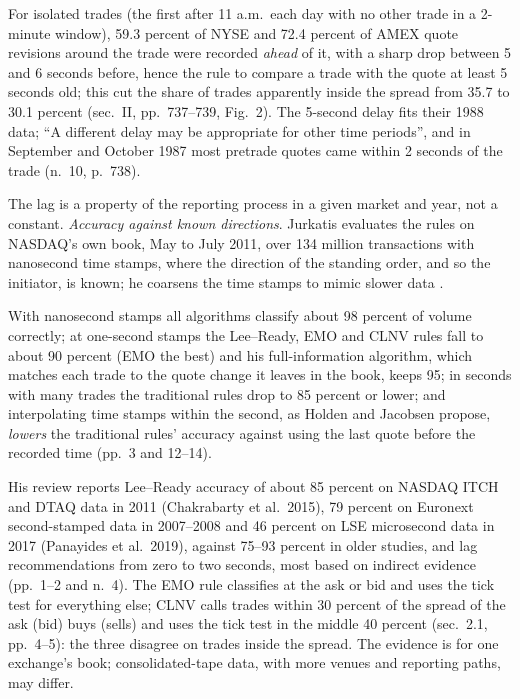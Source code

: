 \begin{qfmethod}
For isolated trades (the first after 11 a.m.\ each day with no other trade in a 2-minute window), 59.3 percent of NYSE and 72.4 percent of AMEX quote revisions around the trade were recorded \emph{ahead} of it, with a sharp drop between 5 and 6 seconds before, hence the rule to compare a trade with the quote at least 5 seconds old; this cut the share of trades apparently inside the spread from 35.7 to 30.1 percent (sec.~II, pp.~737--739, Fig.~2). The 5-second delay fits their 1988 data; ``A different delay may be appropriate for other time periods'', and in September and October 1987 most pretrade quotes came within 2 seconds of the trade (n.~10, p.~738).

The lag is a property of the reporting process in a given market and year, not a constant. \emph{Accuracy against known directions}. Jurkatis evaluates the rules on NASDAQ's own book, May to July 2011, over 134 million transactions with nanosecond time stamps, where the direction of the standing order, and so the initiator, is known; he coarsens the time stamps to mimic slower data \citep[secs.~1 and~4, pp.~3 and~12]{jurkatis-2020}.

With nanosecond stamps all algorithms classify about 98 percent of volume correctly; at one-second stamps the Lee--Ready, EMO and CLNV rules fall to about 90 percent (EMO the best) and his full-information algorithm, which matches each trade to the quote change it leaves in the book, keeps 95; in seconds with many trades the traditional rules drop to 85 percent or lower; and interpolating time stamps within the second, as Holden and Jacobsen propose, \emph{lowers} the traditional rules' accuracy against using the last quote before the recorded time (pp.~3 and 12--14).

His review reports Lee--Ready accuracy of about 85 percent on NASDAQ ITCH and DTAQ data in 2011 (Chakrabarty et al.\ 2015), 79 percent on Euronext second-stamped data in 2007--2008 and 46 percent on LSE microsecond data in 2017 (Panayides et al.\ 2019), against 75--93 percent in older studies, and lag recommendations from zero to two seconds, most based on indirect evidence (pp.~1--2 and n.~4). The EMO rule classifies at the ask or bid and uses the tick test for everything else; CLNV calls trades within 30 percent of the spread of the ask (bid) buys (sells) and uses the tick test in the middle 40 percent (sec.~2.1, pp.~4--5): the three disagree on trades inside the spread. The evidence is for one exchange's book; consolidated-tape data, with more venues and reporting paths, may differ.


\end{qfmethod}
